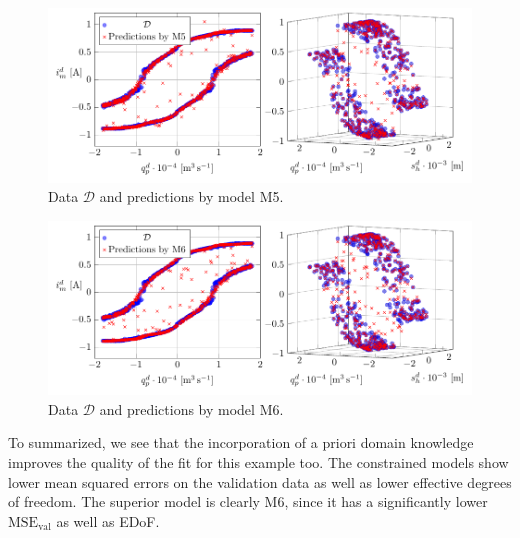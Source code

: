 \begin{figure}[H]
	\centering 
	\includegraphics{graphics/pgfplots/cha5/Bosch/M5.pdf}
	\caption{Data $\mathcal{D}$ and predictions by model M5.}
	\label{fig:bosch-M5}
\end{figure}

\begin{figure}[H]
	\centering 
	\includegraphics{graphics/pgfplots/cha5/Bosch/M6.pdf}
	\caption{Data $\mathcal{D}$ and predictions by model M6.}
	\label{fig:bosch-M6}
\end{figure}

To summarized, we see that the incorporation of a priori domain knowledge improves the quality of the fit for this example too. The constrained models show lower mean squared errors on the validation data as well as lower effective degrees of freedom. The superior model is clearly M6, since it has a significantly lower $\text{MSE}_{\text{val}}$ as well as EDoF. 